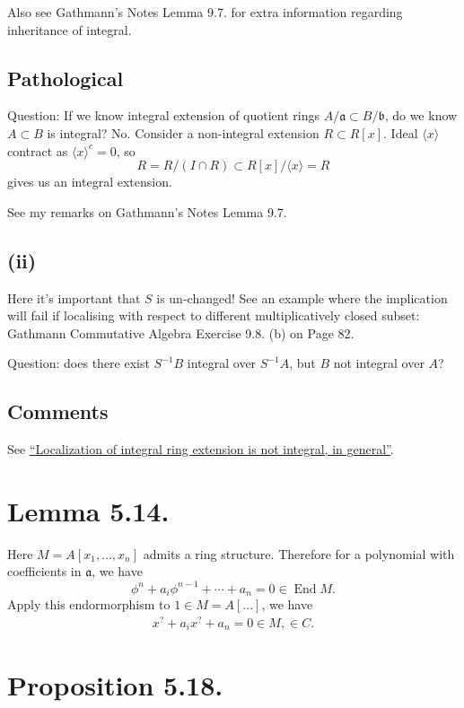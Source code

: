 Also see Gathmann's Notes Lemma 9.7. for extra information regarding inheritance of integral.

\subsection{Pathological}

Question: If we know integral extension of quotient rings $A/\mathfrak a\subset B/\mathfrak b$, do we know $A\subset B$ is integral? No. Consider a non-integral extension $R\subset R[x]$. Ideal $\langle x\rangle$ contract as $\langle x\rangle^c=0$, so 
\[R=R/(I\cap R)\subset R[x]/\langle x\rangle=R\] gives us an integral extension.

See my remarks on Gathmann's Notes Lemma 9.7.

\subsection{(ii)}

Here it's important that $S$ is un-changed! See an example where the implication will fail if localising with respect to different multiplicatively closed subset: Gathmann Commutative Algebra Exercise 9.8. (b) on Page 82.

Question: does there exist $S^{-1}B$ integral over $S^{-1}A$, but $B$ not integral over $A$?

\subsection{Comments}

See \href{https://math.stackexchange.com/questions/3458848/localization-of-integral-ring-extension-is-not-integral-in-general}{\enquote{Localization of integral ring extension is not integral, in general}}.

\section{Lemma 5.14.}

Here $M=A[x_1,...,x_n]$ admits a ring structure. Therefore for a polynomial with coefficients in $\mathfrak a$, we have 
\[\phi^n+a_i\phi^{n-1}+\cdots+a_n=0\in\operatorname{End}M.\]Apply this endormorphism to $1\in M=A[...]$, we have 
\begin{align*}
	x^?+a_i x^?+a_n=0\in M, \in C.
\end{align*}

\section{Proposition 5.18.}

